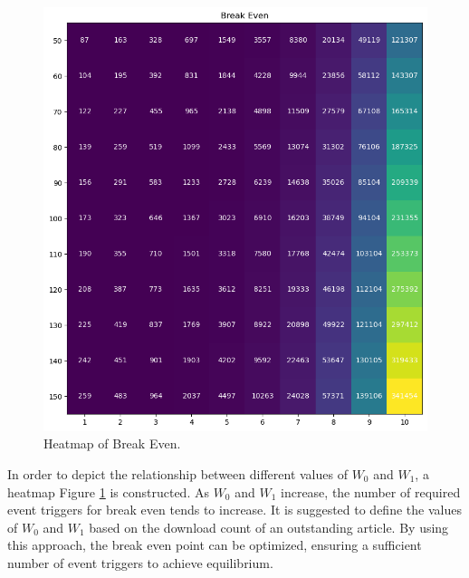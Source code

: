 \documentclass[lettersize,journal]{IEEEtran}
\begin{document}
\begin{figure}[h]
  \centering
  \includegraphics[width=\linewidth]{assets/heatmap-breakeven.png}
  \caption{Heatmap of Break Even.}
  \label{fig:heatmap-breakeven}
\end{figure}

In order to depict the relationship between different values of $W_0$ and $W_1$, a heatmap Figure \ref{fig:heatmap-breakeven} is constructed. As $W_0$ and $W_1$ increase, the number of required event triggers for break even tends to increase. It is suggested to define the values of $W_0$ and $W_1$ based on the download count of an outstanding article. By using this approach, the break even point can be optimized, ensuring a sufficient number of event triggers to achieve equilibrium. 
\end{document}
